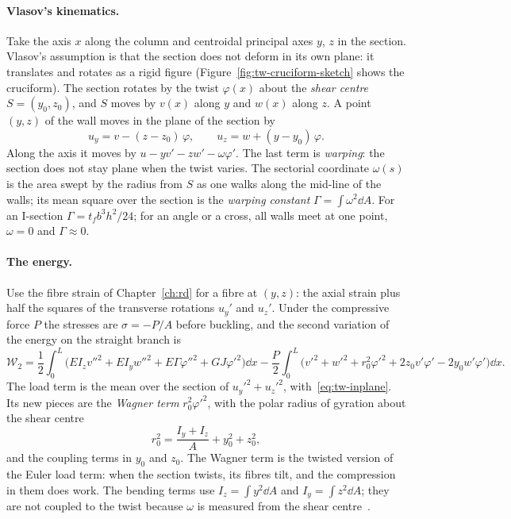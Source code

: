 \paragraph{Vlasov's kinematics.}
%
Take the axis $x$ along the column and centroidal principal axes $y$, $z$ in the section. Vlasov's
assumption is that the section does not deform in its own plane: it translates and rotates as a
rigid figure (Figure~\ref{fig:tw-cruciform-sketch} shows the cruciform). The section rotates by the
twist $\varphi(x)$ about the \emph{shear centre} $S = (y_0, z_0)$, and $S$ moves by $v(x)$ along $y$ and
$w(x)$ along $z$. A point $(y,z)$ of the wall moves in the plane of the section by
\begin{equation}\label{eq:tw-inplane}
  u_y = v - (z - z_0)\,\varphi ,
  \qquad
  u_z = w + (y - y_0)\,\varphi .
\end{equation}
Along the axis it moves by $u - yv' - zw' - \omega\varphi'$. The last term is \emph{warping}: the
section does not stay plane when the twist varies. The sectorial coordinate $\omega(s)$ is the area
swept by the radius from $S$ as one walks along the mid-line of the walls; its mean square over the
section is the \emph{warping constant} $\Gamma = \displaystyle\int\omega^2\dd A$. For an I-section
$\Gamma = t_fb^3h^2/24$; for an angle or a cross, all walls meet at one point, $\omega = 0$ and
$\Gamma \approx 0$.

\paragraph{The energy.}
Use the fibre strain of Chapter~\ref{ch:rd} for a fibre at $(y,z)$: the axial strain plus half the
squares of the transverse rotations $u_y'$ and $u_z'$. Under the compressive force $P$ the stresses
are $\sigma = -P/A$ before buckling, and the second variation of the energy on the straight branch is
\begin{equation}\label{eq:tw-energy}
  \mathcal{W}_2 = \frac12\int_0^L\bigl(EI_zv''^2 + EI_yw''^2 + E\Gamma\varphi''^2 + GJ\varphi'^2\bigr)\dd x
  - \frac P2\int_0^L\bigl(v'^2 + w'^2 + r_0^2\varphi'^2 + 2z_0v'\varphi' - 2y_0w'\varphi'\bigr)\dd x .
\end{equation}
The load term is the mean over the section of $u_y'^2 + u_z'^2$, with~\eqref{eq:tw-inplane}. Its new
pieces are the \emph{Wagner term} $r_0^2\varphi'^2$, with the polar radius of gyration about the shear
centre
\begin{equation}\label{eq:tw-r0}
  r_0^2 = \frac{I_y + I_z}{A} + y_0^2 + z_0^2 ,
\end{equation}
and the coupling terms in $y_0$ and $z_0$. The Wagner term is the twisted version of the Euler load
term: when the section twists, its fibres tilt, and the compression in them does work. The bending
terms use $I_z = \displaystyle\int y^2\dd A$ and $I_y = \displaystyle\int z^2\dd A$; they are not coupled to
the twist because $\omega$ is measured from the shear centre~\cite{tw-trahair1993}.

